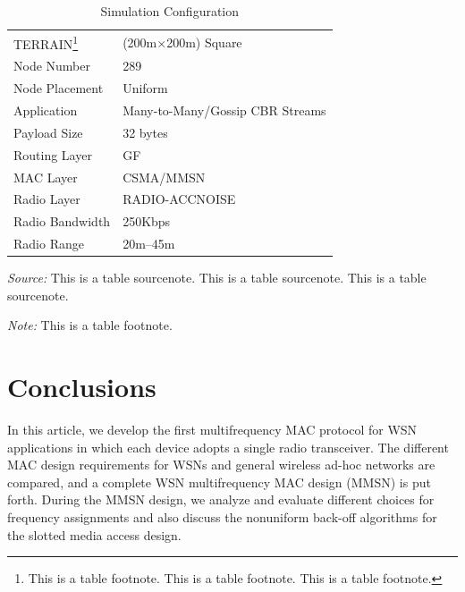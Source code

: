 \documentclass[format=acmsmall, review=false]{acmart}
\begin{document}
\begin{table}%
	\caption{Simulation Configuration}
	\label{tab:one}
	\begin{minipage}{\columnwidth}
		\begin{center}
			\begin{tabular}{ll}
				\toprule
				TERRAIN\footnote{This is a table footnote. This is a
					table footnote. This is a table footnote.}   & (200m$\times$200m) Square\\
				Node Number     & 289\\
				Node Placement  & Uniform\\
				Application     & Many-to-Many/Gossip CBR Streams\\
				Payload Size    & 32 bytes\\
				Routing Layer   & GF\\
				MAC Layer       & CSMA/MMSN\\
				Radio Layer     & RADIO-ACCNOISE\\
				Radio Bandwidth & 250Kbps\\
				Radio Range     & 20m--45m\\
				\bottomrule
			\end{tabular}
		\end{center}
		\bigskip\centering
		\footnotesize\emph{Source:} This is a table
		sourcenote. This is a table sourcenote. This is a table
		sourcenote.
		
		\emph{Note:} This is a table footnote.
	\end{minipage}
\end{table}%


\section{Conclusions}

In this article, we develop the first multifrequency MAC protocol for
WSN applications in which each device adopts a
single radio transceiver. The different MAC design requirements for
WSNs and general wireless ad-hoc networks are
compared, and a complete WSN multifrequency MAC design (MMSN) is
put forth. During the MMSN design, we analyze and evaluate different
choices for frequency assignments and also discuss the nonuniform
back-off algorithms for the slotted media access design.

\end{document}
